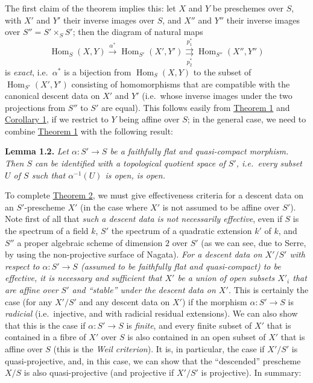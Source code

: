 \documentclass{article}
\newenvironment{itenv}[1]
  {\phantomsection\par\smallskip\noindent\textbf{#1.}\itshape}
  {\par\smallskip}
\newcommand{\oldpage}[1]{\marginpar{\footnotesize$\Big\vert$ \textit{p.~#1}}}
\theoremstyle{definition}
\theoremstyle{definition}
\theoremstyle{definition}
\theoremstyle{definition}
\theoremstyle{remark}
\begin{document}
The first claim of the theorem implies this:
let \(X\) and \(Y\) be preschemes over \(S\), with \(X'\) and \(Y'\) their inverse images over \(S\), and \(X''\) and \(Y''\) their inverse images over \(S''=S'\times_S S'\);
then the diagram of natural maps
\[
  \operatorname{Hom}_S(X,Y) \xrightarrow{\alpha^*}
  \operatorname{Hom}_{S'}(X',Y') \overset{p_1^*}{\underset{p_2^*}{\rightrightarrows}}
  \operatorname{Hom}_{S''}(X'',Y'')
\]
is \emph{exact}, i.e.~\(\alpha^*\) is a bijection from \(\operatorname{Hom}_S(X,Y)\) to the subset of \(\operatorname{Hom}_{S'}(X',Y')\) consisting of homomorphisms that are compatible with the canonical descent data on \(X'\) and \(Y'\) (i.e.~whose inverse images under the two projections from \(S''\) to \(S'\) are equal).
This follows easily from \protect\hyperlink{fga-3-i-section-B.1-theorem-1}{Theorem 1} and \protect\hyperlink{fga-3-i-section-B.1-corollary-1}{Corollary 1}, if we restrict to \(Y\) being affine over \(S\);
in the general case, we need to combine \protect\hyperlink{fga-3-i-section-B.1-theorem-1}{Theorem 1} with the following result:

\leavevmode{}%
\begin{itenv}{Lemma 1.2}
Let \(\alpha\colon S'\to S\) be a faithfully flat and quasi-compact morphism.
Then \(S\) can be identified with a \emph{topological quotient space of \(S'\)}, i.e.~every subset \(U\) of \(S\) such that \(\alpha^{-1}(U)\) is open, is open.

\end{itenv}

To complete \protect\hyperlink{fga-3-i-section-B.1-theorem-2}{Theorem 2}, we must give effectiveness criteria for a descent data on an \(S'\)-prescheme \(X'\) (in the case where \(X'\) is not assumed to be affine over \(S'\)).
Note first of all that \emph{such a descent data is not necessarily effective}, even if \(S\) is the spectrum of a field \(k\), \(S'\) the spectrum of a quadratic extension \(k'\) of \(k\), and \(S''\) a proper algebraic scheme of dimension \(2\) over \(S'\) (as we can see, due to Serre, by using the non-projective surface of Nagata).
\emph{For a descent data on \(X'/S'\) with respect to \(\alpha\colon S'\to S\) (assumed to be faithfully flat and quasi-compact) to be effective, it is necessary and sufficient that \(X'\) be a union of open subsets \(X'_i\) that are affine over \(S'\) and ``stable'' under the descent data on \(X'\).}
This is certainly the case (for any \(X'/S'\) and any descent data on \(X'\)) if the morphism \(\alpha\colon S'\to S\) is \emph{radicial} (i.e.~injective, and with radicial residual extensions).
\oldpage{190-20}We can also show that this is the case if \(\alpha\colon S'\to S\) is \emph{finite}, and every finite subset of \(X'\) that is contained in a fibre of \(X'\) over \(S\) is also contained in an open subset of \(X'\) that is affine over \(S\) (this is the \emph{Weil criterion}).
It is, in particular, the case if \(X'/S'\) is quasi-projective, and, in this case, we can show that the ``descended'' prescheme \(X/S\) is also quasi-projective (and projective if \(X'/S'\) is projective).
In summary:
\end{document}
